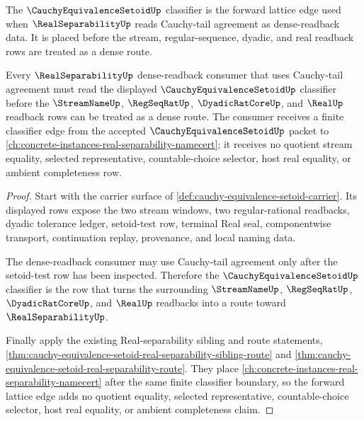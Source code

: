 The $\CauchyEquivalenceSetoidUp$ classifier is the forward lattice edge used when $\RealSeparabilityUp$ reads Cauchy-tail agreement as dense-readback data. It is placed before the stream, regular-sequence, dyadic, and real readback rows are treated as a dense route.

\begin{theorem}
\label{thm:cauchy-equivalence-setoid-real-separability-forward-lattice}
Every $\RealSeparabilityUp$ dense-readback consumer that uses Cauchy-tail agreement must read the displayed $\CauchyEquivalenceSetoidUp$ classifier before the $\StreamNameUp$, $\RegSeqRatUp$, $\DyadicRatCoreUp$, and $\RealUp$ readback rows can be treated as a dense route. The consumer receives a finite classifier edge from the accepted $\CauchyEquivalenceSetoidUp$ packet to \autoref{ch:concrete-instances-real-separability-namecert}; it receives no quotient stream equality, selected representative, countable-choice selector, host real equality, or ambient completeness row.
\end{theorem}
\begin{proof}
Start with the carrier surface of \autoref{def:cauchy-equivalence-setoid-carrier}. Its displayed rows expose the two stream windows, two regular-rational readbacks, dyadic tolerance ledger, setoid-test row, terminal Real seal, componentwise transport, continuation replay, provenance, and local naming data.

The dense-readback consumer may use Cauchy-tail agreement only after the setoid-test row has been inspected. Therefore the $\CauchyEquivalenceSetoidUp$ classifier is the row that turns the surrounding $\StreamNameUp$, $\RegSeqRatUp$, $\DyadicRatCoreUp$, and $\RealUp$ readbacks into a route toward $\RealSeparabilityUp$.

Finally apply the existing Real-separability sibling and route statements, \autoref{thm:cauchy-equivalence-setoid-real-separability-sibling-route} and \autoref{thm:cauchy-equivalence-setoid-real-separability-route}. They place \autoref{ch:concrete-instances-real-separability-namecert} after the same finite classifier boundary, so the forward lattice edge adds no quotient equality, selected representative, countable-choice selector, host real equality, or ambient completeness claim.
\end{proof}
